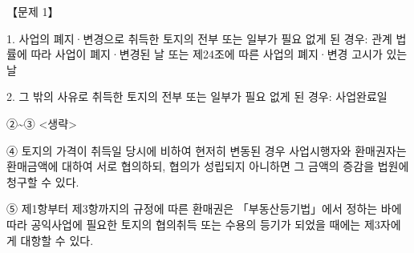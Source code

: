 \begin{longquestion}{【문제 1】}
\begin{framedtext}
\hspace*{1em}1. 사업의 폐지·변경으로 취득한 토지의 전부 또는 일부가 필요 없게 된 경우: 관계 법률에 따라 사업이 폐지·변경된 날 또는 제24조에 따른 사업의 폐지·변경 고시가 있는 날 \par
\hspace*{1em}2. 그 밖의 사유로 취득한 토지의 전부 또는 일부가 필요 없게 된 경우: 사업완료일 \par
②\textasciitilde{}③ <생략> \par
④ 토지의 가격이 취득일 당시에 비하여 현저히 변동된 경우 사업시행자와 환매권자는 환매금액에 대하여 서로 협의하되, 협의가 성립되지 아니하면 그 금액의 증감을 법원에 청구할 수 있다. \par
⑤ 제1항부터 제3항까지의 규정에 따른 환매권은 「부동산등기법」에서 정하는 바에 따라 공익사업에 필요한 토지의 협의취득 또는 수용의 등기가 되었을 때에는 제3자에게 대항할 수 있다. \par
\end{framedtext}
\end{longquestion}

